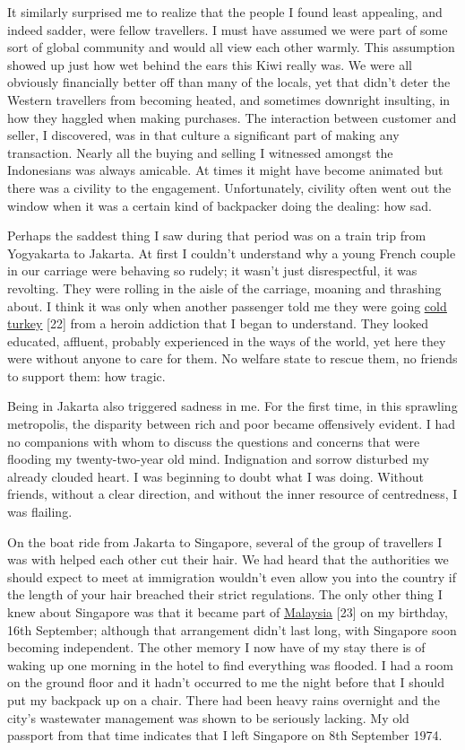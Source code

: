 It similarly surprised me to realize that the people I found least
appealing, and indeed sadder, were fellow travellers. I must have
assumed we were part of some sort of global community and would all view
each other warmly. This assumption showed up just how wet behind the
ears this Kiwi really was. We were all obviously financially better off
than many of the locals, yet that didn't deter the Western travellers
from becoming heated, and sometimes downright insulting, in how they
haggled when making purchases. The interaction between customer and
seller, I discovered, was in that culture a significant part of making
any transaction. Nearly all the buying and selling I witnessed amongst
the Indonesians was always amicable. At times it might have become
animated but there was a civility to the engagement. Unfortunately,
civility often went out the window when it was a certain kind of
backpacker doing the dealing: how sad.

Perhaps the saddest thing I saw during that period was on a train trip
from Yogyakarta to Jakarta. At first I couldn't understand why a young
French couple in our carriage were behaving so rudely; it wasn't just
disrespectful, it was revolting. They were rolling in the aisle of the
carriage, moaning and thrashing about. I think it was only when another
passenger told me they were going
\href{https://americanaddictioncenters.org/heroin-treatment/cold-turkey}{\underline{cold
turkey}} {[}22{]} from a heroin addiction that I began to understand.
They looked educated, affluent, probably experienced in the ways of the
world, yet here they were without anyone to care for them. No welfare
state to rescue them, no friends to support them: how tragic.

Being in Jakarta also triggered sadness in me. For the first time, in
this sprawling metropolis, the disparity between rich and poor became
offensively evident. I had no companions with whom to discuss the
questions and concerns that were flooding my twenty-two-year old mind.
Indignation and sorrow disturbed my already clouded heart. I was
beginning to doubt what I was doing. Without friends, without a clear
direction, and without the inner resource of centredness, I was
flailing.

On the boat ride from Jakarta to Singapore, several of the group of
travellers I was with helped each other cut their hair. We had heard
that the authorities we should expect to meet at immigration wouldn't
even allow you into the country if the length of your hair breached
their strict regulations. The only other thing I knew about Singapore
was that it became part of
\href{https://en.wikipedia.org/wiki/Malaysia_Day}{\underline{Malaysia}}
{[}23{]} on my birthday, 16th September; although that arrangement
didn't last long, with Singapore soon becoming independent. The other
memory I now have of my stay there is of waking up one morning in the
hotel to find everything was flooded. I had a room on the ground floor
and it hadn't occurred to me the night before that I should put my
backpack up on a chair. There had been heavy rains overnight and the
city's wastewater management was shown to be seriously lacking. My old
passport from that time indicates that I left Singapore on 8th September
1974.

